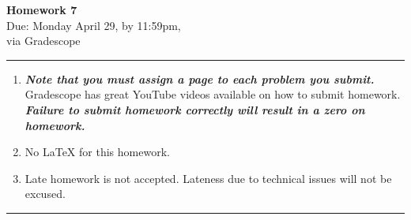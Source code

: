 \documentclass[12pt]{article}
\newif\ifshow
\begin{document}
\begin{center}
\ifshow
  \textbf{\Large Homework 8 Solution}\\
\else
  \textbf{\Large Homework 7}\\
\fi
Due: Monday April 29, by 11:59pm,\\via Gradescope\\
\end{center}

\hrule

\vspace{0.2cm}

\begin{enumerate}[$\bullet$]
\item  {\textbf{\textit{Note that you must assign a page to each problem you submit.}}}   Gradescope has great YouTube videos available on how to submit homework.  \textit{\textbf{Failure to submit homework correctly will result in a zero on homework.}}
\item No LaTeX for this homework.  
\item Late homework is not accepted.  Lateness due to technical issues will not be excused.  
\end{enumerate}

\hrule

\vspace{0.5cm}
\end{document}

